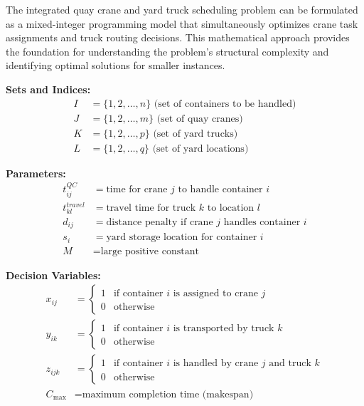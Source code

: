 \documentclass{article}
\begin{document}
The integrated quay crane and yard truck scheduling problem can be formulated as a mixed-integer programming model that simultaneously optimizes crane task assignments and truck routing decisions. This mathematical approach provides the foundation for understanding the problem's structural complexity and identifying optimal solutions for smaller instances.

\textbf{Sets and Indices:}
\begin{align}
I &= \{1, 2, \ldots, n\} \text{ (set of containers to be handled)} \\
J &= \{1, 2, \ldots, m\} \text{ (set of quay cranes)} \\
K &= \{1, 2, \ldots, p\} \text{ (set of yard trucks)} \\
L &= \{1, 2, \ldots, q\} \text{ (set of yard locations)}
\end{align}

\textbf{Parameters:}
\begin{align}
t_{ij}^{QC} &= \text{time for crane } j \text{ to handle container } i \\
t_{kl}^{travel} &= \text{travel time for truck } k \text{ to location } l \\
d_{ij} &= \text{distance penalty if crane } j \text{ handles container } i \\
s_i &= \text{yard storage location for container } i \\
M &= \text{large positive constant}
\end{align}

\textbf{Decision Variables:}
\begin{align}
x_{ij} &= \begin{cases} 
1 & \text{if container } i \text{ is assigned to crane } j \\
0 & \text{otherwise}
\end{cases} \\
y_{ik} &= \begin{cases} 
1 & \text{if container } i \text{ is transported by truck } k \\
0 & \text{otherwise}
\end{cases} \\
z_{ijk} &= \begin{cases} 
1 & \text{if container } i \text{ is handled by crane } j \text{ and truck } k \\
0 & \text{otherwise}
\end{cases} \\
C_{\max} &= \text{maximum completion time (makespan)}
\end{align}
\end{document}
